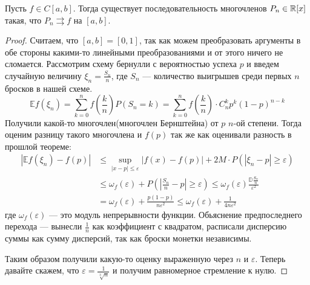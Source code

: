  \begin{theorem}[Вейерштрасса]
    Пусть $f \in C[a, b]$. Тогда существует последовательность многочленов $P_n \in \mathbb{R}[x]$ такая, что $P_n \rightrightarrows f$ на $[a, b]$.
 \end{theorem}
 \begin{proof}
     Считаем, что $[a, b] = [0, 1]$, так как можем преобразовать аргументы в обе стороны какими-то линейными преобразованиями и от этого ничего не сломается. Рассмотрим схему бернулли с вероятностью успеха $p$ и введем случайную величину $\xi_n = \frac{S_n}{n}$, где $S_n$ --- количество выигрышев среди первых $n$ бросков в нашей схеме. 
     \begin{equation*}
         \mathbb{E} f(\xi_n) = 
         \sum\limits_{k = 0}^n f\left( \frac{k}{n}\right) P(S_n = k) = 
         \sum\limits_{k = 0}^n f\left( \frac{k}{n}\right) \cdot C_n^k p^k (1-p)^{n - k}
     \end{equation*}
     Получили какой-то многочлен(многочлен Бернштейна) от $p$ $n$-ой степени. Тогда оценим разницу такого многочлена и $f(p)$ так же как оценивали разность в прошлой теореме:
     \begin{align*}
         | \mathbb{E} f(\xi_n) - f(p) | 
         &\leq 
         \sup\limits_{|x - p| \leq \varepsilon} |f(x) - f(p)| + 2M \cdot P(|\xi_n - p| \geq \varepsilon) \\
         &\leq 
         \omega_f(\varepsilon) + P \left(\left | \frac{S_n}{n} - p \right | \geq \varepsilon \right) \leq \omega_f(\varepsilon) \frac{\mathbb{D} \frac{S_n}{n}}{\varepsilon^2} \\
         &=
         \omega_f(\varepsilon) + \frac{p(1 - p)}{n\varepsilon^2} \leq 
         \omega_f(\varepsilon) + \frac{1}{4n\varepsilon^2}
     \end{align*}
     где $\omega_f(\varepsilon)$ --- это модуль непрерывности функции. Обьяснение предпоследнего перехода --- вынесли $\frac{1}{n}$ как коэффициент с квадратом, расписали дисперсию суммы как сумму дисперсий, так как броски монетки независимы.
     
     Таким образом получили какую-то оценку выраженную через $n$ и $\varepsilon$. Теперь давайте скажем, что $\varepsilon = \frac{1}{\sqrt[3]{n}}$ и получим равномерное стремление к нулю.
 \end{proof}\newpage
